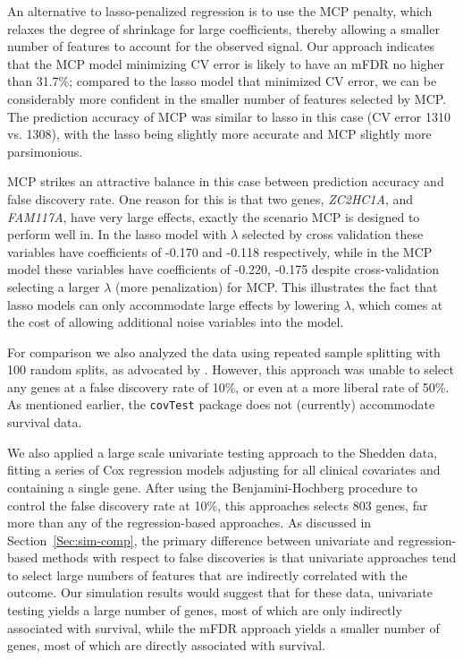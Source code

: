 An alternative to lasso-penalized regression is to use the MCP penalty, which relaxes the degree of shrinkage for large coefficients, thereby allowing a smaller number of features to account for the observed signal.  Our approach indicates that the MCP model minimizing CV error is likely to have an mFDR no higher than 31.7\%; compared to the lasso model that minimized CV error, we can be considerably more confident in the smaller number of features selected by MCP.  The prediction accuracy of MCP was similar to lasso in this case (CV error 1310 vs. 1308), with the lasso being slightly more accurate and MCP slightly more parsimonious.

MCP strikes an attractive balance in this case between prediction accuracy and false discovery rate.  One reason for this is that two genes, \textit{ZC2HC1A}, and \textit{FAM117A}, have very large effects, exactly the scenario MCP is designed to perform well in. In the lasso model with $\lambda$ selected by cross validation these variables have coefficients of -0.170 and -0.118 respectively, while in the MCP model these variables have coefficients of -0.220, -0.175 despite cross-validation selecting a larger $\lambda$ (more penalization) for MCP.  This illustrates the fact that lasso models can only accommodate large effects by lowering $\lambda$, which comes at the cost of allowing additional noise variables into the model.

For comparison we also analyzed the data using repeated sample splitting with 100 random splits, as advocated by  \citet{Meinshausen2009}. However, this approach was unable to select any genes at a false discovery rate of 10\%, or even at a more liberal rate of 50\%.
As mentioned earlier, the {\tt covTest} package does not (currently) accommodate survival data.

We also applied a large scale univariate testing approach to the Shedden data, fitting a series of Cox regression models adjusting for all clinical covariates and containing a single gene.  After using the Benjamini-Hochberg procedure to control the false discovery rate at 10\%, this approaches selects 803 genes, far more than any of the regression-based approaches.  As discussed in Section~\ref{Sec:sim-comp}, the primary difference between univariate and regression-based methods with respect to false discoveries is that univariate approaches tend to select large numbers of features that are indirectly correlated with the outcome.  Our simulation results would suggest that for these data, univariate testing yields a large number of genes, most of which are only indirectly associated with survival, while the mFDR approach yields a smaller number of genes, most of which are directly associated with survival.

